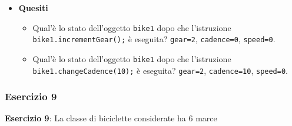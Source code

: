 \documentclass{article}
\theoremstyle{definition}
\begin{document}
\begin{itemize}
\item \textbf{Quesiti}
\begin{itemize}
\item Qual'\`e lo stato dell'oggetto \texttt{bike1} dopo che l'istruzione \texttt{bike1.incrementGear();} \`e eseguita? 
\texttt{gear=2}, \texttt{cadence=0}, \texttt{speed=0}.
\item Qual'\`e lo stato dell'oggetto  \texttt{bike1} dopo che l'istruzione \texttt{bike1.changeCadence(10);} \`e eseguita? 
\texttt{gear=2}, \texttt{cadence=10}, \texttt{speed=0}.
\end{itemize}
\end{itemize}

\subsubsection{Esercizio 9}
\begin{framed}
\textbf{Esercizio 9}: La classe di biciclette considerate ha $6$ marce
\end{framed}
\end{document}
